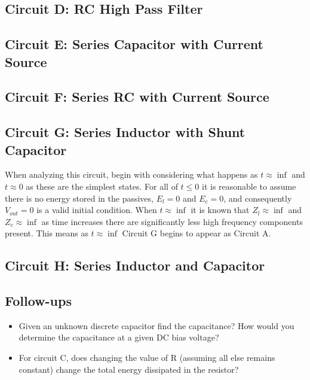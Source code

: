 \documentclass[main.tex]{subfiles}
\begin{document}
\subsection{Circuit D: RC High Pass Filter}

\subsection{Circuit E: Series Capacitor with Current Source}

\subsection{Circuit F: Series RC with Current Source}

\subsection{Circuit G: Series Inductor with Shunt Capacitor}
When analyzing this circuit, begin with considering what happens as $t \approx \inf$ and $t \approx 0$ as these are the simplest states. For all of $t \leq 0$ it is reasonable to assume there is no energy stored in the passives, $E_l = 0$ and $E_c = 0$, and consequently $V_{out} = 0$ is a valid initial condition. When $t \approx \inf$ it is known that $Z_l \approx \inf$ and $Z_c \approx \inf$ as time increases there are significantly less high frequency components present. This means as $t \approx \inf$ Circuit G begins to appear as Circuit A. 





\subsection{Circuit H: Series Inductor and Capacitor}


\subsection{Follow-ups}
\begin{itemize}
    \item Given an unknown discrete capacitor find the capacitance? How would you determine the capacitance at a given DC bias voltage? %
    \item For circuit C, does changing the value of R (assuming all else remains constant) change the total energy dissipated in the resistor? %
\end{itemize}
\end{document}
